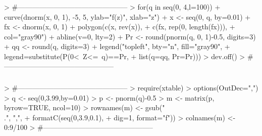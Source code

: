 \documentclass[14pt,aspectratio=1610]{beamer}
\begin{document}
\begin{frame}[fragile]{}
\frametitle{}
\begin{block}{}
\begin{Schunk}
\begin{Sinput}
> #-----------------------------------------------
> for(q in seq(0, 4,l=100)){
+   curve(dnorm(x, 0, 1), -5, 5, ylab="f(z)", xlab="z")
+   x <- seq(0, q, by=0.01)
+   fx <- dnorm(x, 0, 1)
+   polygon(c(x, rev(x)),
+           c(fx, rep(0, length(fx))),
+           col="gray90")
+   abline(v=0, lty=2)
+   Pr <- round(pnorm(q, 0, 1)-0.5, digits=3)
+   qq <- round(q, digits=3)
+   legend("topleft", bty="n", fill="gray90",
+          legend=substitute(P(0<~Z<=~q)==Pr, 
+                            list(q=qq, Pr=Pr)))}
> dev.off()
> #-----------------------------------------------
\end{Sinput}
\end{Schunk}
\end{block}
\end{frame}

\begin{frame}[fragile]{}
\frametitle{}
\begin{block}{}
\begin{Schunk}
\begin{Sinput}
> #-----------------------------------------------
> require(xtable)
> options(OutDec=",")
> q <- seq(0,3.99,by=0.01)
> p <- pnorm(q)-0.5
> m <- matrix(p, byrow=TRUE, ncol=10)
> rownames(m) <- gsub("\\.", ",", 
+                     formatC(seq(0,3.9,0.1),
+                             dig=1, format="f"))
> colnames(m) <- 0:9/100
> #-----------------------------------------------
\end{Sinput}
\end{Schunk}
\end{block}
\end{frame}

\begin{frame}[fragile]{}
\frametitle{}
\begin{block}{}
\begin{center}
\end{center}
\end{block}
\end{frame}
\end{document}
